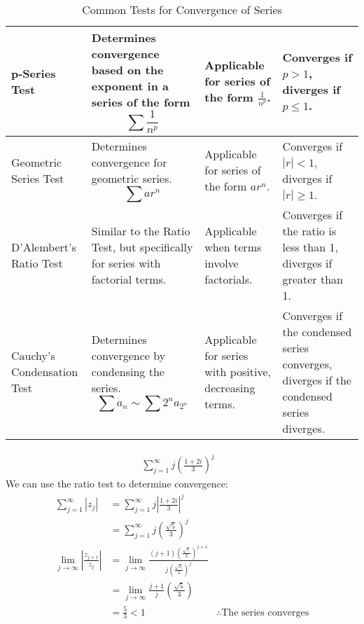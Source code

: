 \begin{table}[htbp]
\begin{tabular}{| m{2cm} | m{5cm} | m{3cm} | m{3cm} |}
        \hline
        p-Series Test              & Determines convergence based on the exponent in a series of the form \[ \sum \frac{1}{n^p} \]         & Applicable for series of the form \(\frac{1}{n^p}\).                      & Converges if \( p > 1 \), diverges if \( p \leq 1 \).                                     \\
        \hline
        Geometric Series Test      & Determines convergence for geometric series. \[ \sum ar^n \]                                          & Applicable for series of the form \(ar^n\).                               & Converges if \( |r| < 1 \), diverges if \( |r| \geq 1 \).                                 \\
        \hline
        D'Alembert's Ratio Test    & Similar to the Ratio Test, but specifically for series with factorial terms.                          & Applicable when terms involve factorials.                                 & Converges if the ratio is less than 1, diverges if greater than 1.                        \\
        \hline
        Cauchy's Condensation Test & Determines convergence by condensing the series. \[ \sum a_n \sim \sum 2^n a_{2^n} \]                 & Applicable for series with positive, decreasing terms.                    & Converges if the condensed series converges, diverges if the condensed series diverges.   \\
        \hline
    \end{tabular}
    \caption{Common Tests for Convergence of Series}
    \label{table:convergence_tests}
\end{table}


\begin{example}
    \begin{align}
        \sum_{j=1}^{\infty} j \left( \frac{1 + 2i}{3} \right)^j &
    \end{align}
    We can use the ratio test to determine convergence:
    \begin{align}
        \sum_{j=1}^{\infty} \left| z_j \right|                 & = \sum_{j=1}^{\infty} j \left| \frac{1 + 2i}{3} \right|^j                                 \\
                                                               & = \sum_{j=1}^{\infty} j \left( \frac{\sqrt{5}}{3} \right)^j                               \\
        \lim_{j \to \infty} \left| \frac{z_{j+1}}{z_j} \right| & = \lim_{j \to \infty} \frac{(j+1)({\frac{\sqrt{5}}{3}})^{j + 1}}{j(\frac{\sqrt{5}}{3})^j} \\
                                                               & = \lim_{j \to \infty} \frac{j+1}{j} \left( \frac{\sqrt{5}}{3} \right)                     \\
                                                               & = \frac{5}{3} < 1
                                                               & \therefore \text{The series converges}
    \end{align}
\end{example}

